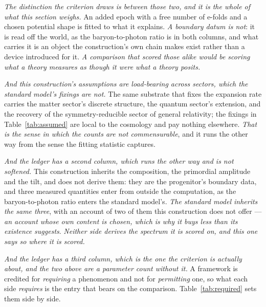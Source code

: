 \documentclass[11pt,a4paper]{article}
\theoremstyle{plain}
\theoremstyle{definition}
\begin{document}
\emph{The distinction the criterion draws is between those two, and it is the whole of what this section
weighs.} An added epoch with a free number of e-folds and a chosen potential shape is fitted to what it
explains. \emph{A boundary datum is not}: it is read off the world, as the baryon-to-photon ratio is in both
columns, and what carries it is an object the construction's own chain makes exist rather than a device
introduced for it. \emph{A comparison that scored those alike would be scoring what a theory measures as
though it were what a theory posits.}

\emph{And this construction's assumptions are load-bearing across sectors, which the standard model's fixings
are not.} The same substrate that fixes the expansion rate carries the matter sector's discrete structure, the
quantum sector's extension, and the recovery of the symmetry-reducible sector of general relativity; the
fixings in Table~\ref{tab:assumed} are local to the cosmology and pay nothing elsewhere. \emph{That is the
sense in which the counts are not commensurable}, and it runs the other way from the sense the fitting
statistic captures.

\emph{And the ledger has a second column, which runs the other way and is not softened.} This construction
inherits the composition, the primordial amplitude and the tilt, and does not derive them: they are the
progenitor's boundary data, and three measured quantities enter from outside the computation, as the
baryon-to-photon ratio enters the standard model's. \emph{The standard model inherits the same three}, with an account of two of them
this construction does not offer --- \emph{an account whose own content is chosen, which is why it buys less
than its existence suggests}. \emph{Neither side derives the spectrum it is scored on, and this one says so
where it is scored.}

\emph{And the ledger has a third column, which is the one the criterion is actually about, and the two above
are a parameter count without it.} A framework is credited for \emph{requiring} a phenomenon and not for
\emph{permitting} one, so what each side \emph{requires} is the entry that bears on the comparison.
Table~\ref{tab:required} sets them side by side.
\end{document}
